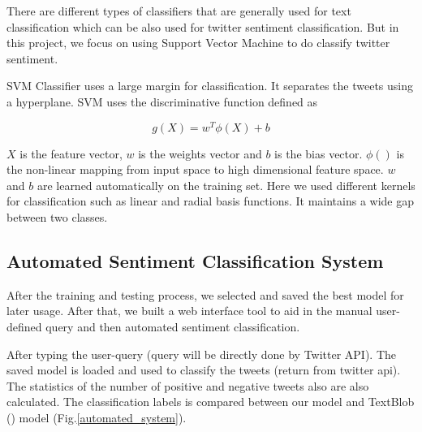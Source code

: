 There are different types of classifiers that are generally used for text classification which can be also used for twitter sentiment classification. But in this project, we focus on using  Support Vector Machine to do classify twitter sentiment.

SVM Classifier uses a large margin for classification. It separates the tweets using a hyperplane. SVM uses the discriminative function defined as

\begin{equation} \label{eq: svm}
g(X) = w^T \phi(X) + b
\end{equation}

$X$ is the feature vector, $w$ is the weights vector and $b$ is
the bias vector. $\phi()$ is the non-linear mapping from input space to high dimensional feature space. $w$ and $b$ are learned
automatically on the training set. Here we used different kernels for classification such as linear and radial basis functions. It maintains a wide gap between two classes.


\subsection{Automated Sentiment Classification System}
\label{sec: system}

After the training and testing process, we selected and saved the best model for later usage. After that, we built a web interface tool to aid in the manual user-defined query and then automated sentiment classification. 
 
After typing the user-query (query will be directly done by Twitter API).  The saved model is loaded and used to classify the tweets (return from twitter api). The statistics of the number of positive and negative tweets also are also calculated. The classification labels is compared between our model and TextBlob (\cite{loria2014textblob}) model (Fig.\ref{automated_system}).

\begin{figure*}[!t]
    \caption{\label{automated_system} Automated sentiment classification system}
\end{figure*}


